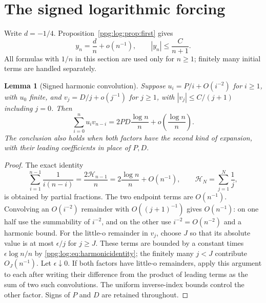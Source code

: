 \documentclass[11pt,letterpaper]{article}
\newtheorem{lemma}[theorem]{Lemma}
\theoremstyle{remark}\newtheorem{remark}[theorem]{Remark}
\numberwithin{equation}{section}
\newcommand{\HH}{\mathcal H}
\begin{document}
\section{The signed logarithmic forcing}\label{ppg:log:sec:forcing}
Write $d=-1/4$. Proposition~\ref{ppg:log:prop:first} gives
\begin{equation}\label{ppg:log:eq:yfirstinput}
 y_n=\frac d n+o(n^{-1}),\qquad |y_n|\le\frac C{n+1}.
\end{equation}
All formulas with $1/n$ in this section are used only for $n\ge1$; finitely many initial terms are handled separately.

\begin{lemma}[Signed harmonic convolution]\label{ppg:log:lem:harmonicconv}
Suppose $u_i=P/i+O(i^{-2})$ for $i\ge1$, with $u_0$ finite, and $v_j=D/j+o(j^{-1})$ for $j\ge1$, with $|v_j|\le C/(j+1)$ including $j=0$. Then
\begin{equation}\label{ppg:log:eq:convlemma}
 \sum_{i=0}^nu_iv_{n-i}
 =2PD\frac{\log n}{n}+o\!\left(\frac{\log n}{n}\right).
\end{equation}
The conclusion also holds when both factors have the second kind of expansion, with their leading coefficients in place of $P,D$.
\end{lemma}
\begin{proof}
The exact identity
\begin{equation}\label{ppg:log:eq:harmonicidentity}
 \sum_{i=1}^{n-1}\frac1{i(n-i)}=\frac{2\HH_{n-1}}n
          =2\frac{\log n}{n}+O(n^{-1}),\qquad
 \HH_N=\sum_{j=1}^N\frac1j,
\end{equation}
is obtained by partial fractions. The two endpoint terms are $O(n^{-1})$. Convolving an $O(i^{-2})$ remainder with $O((j+1)^{-1})$ gives $O(n^{-1})$: on one half use the summability of $i^{-2}$, and on the other use $i^{-2}=O(n^{-2})$ and a harmonic bound. For the little-o remainder in $v_j$, choose $J$ so that its absolute value is at most $\epsilon/j$ for $j\ge J$. These terms are bounded by a constant times $\epsilon\log n/n$ by \eqref{ppg:log:eq:harmonicidentity}; the finitely many $j<J$ contribute $O_J(n^{-1})$. Let $\epsilon\downarrow0$. If both factors have little-o remainders, apply this argument to each after writing their difference from the product of leading terms as the sum of two such convolutions. The uniform inverse-index bounds control the other factor. Signs of $P$ and $D$ are retained throughout.
\end{proof}
\end{document}
